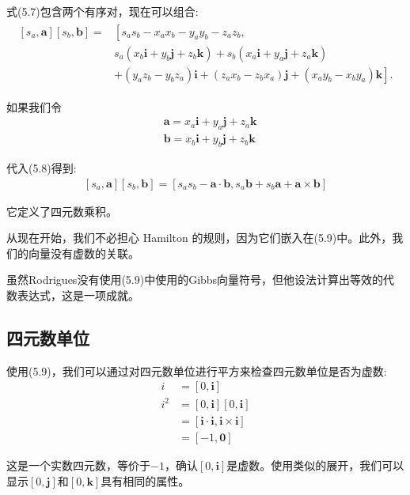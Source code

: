式(5.7)包含两个有序对，现在可以组合:
\begin{align}
    \begin{aligned}
        {\left[s_{a}, \mathbf{a}\right]\left[s_{b}, \mathbf{b}\right]=} & {\left[s_{a} s_{b}-x_{a} x_{b}-y_{a} y_{b}-z_{a} z_{b},\right.} \\
        & s_{a}\left(x_{b} \mathbf{i}+y_{b} \mathbf{j}+z_{b} \mathbf{k}\right)+s_{b}\left(x_{a} \mathbf{i}+y_{a} \mathbf{j}+z_{a} \mathbf{k}\right) \\
        & \left.+\left(y_{a} z_{b}-y_{b} z_{a}\right) \mathbf{i}+\left(z_{a} x_{b}-z_{b} x_{a}\right) \mathbf{j}+\left(x_{a} y_{b}-x_{b} y_{a}\right) \mathbf{k}\right] .
    \end{aligned}
\end{align}

如果我们令
$$
\begin{aligned}
& \mathbf{a}=x_{a} \mathbf{i}+y_{a} \mathbf{j}+z_{a} \mathbf{k} \\
& \mathbf{b}=x_{b} \mathbf{i}+y_{b} \mathbf{j}+z_{b} \mathbf{k}
\end{aligned}
$$

代入(5.8)得到:
\begin{align}
    \left[s_{a}, \mathbf{a}\right]\left[s_{b}, \mathbf{b}\right]=\left[s_{a} s_{b}-\mathbf{a} \cdot \mathbf{b}, s_{a} \mathbf{b}+s_{b} \mathbf{a}+\mathbf{a} \times \mathbf{b}\right]
\end{align}

它定义了四元数乘积。

从现在开始，我们不必担心 Hamilton 的规则，因为它们嵌入在(5.9)中。此外，我们的向量没有虚数的关联。

虽然Rodrigues没有使用(5.9)中使用的Gibbs向量符号，但他设法计算出等效的代数表达式，这是一项成就。

\subsection{四元数单位}
使用(5.9)，我们可以通过对四元数单位进行平方来检查四元数单位是否为虚数:
$$
\begin{aligned}
i & =[0, \mathbf{i}] \\
i^{2} & =[0, \mathbf{i}][0, \mathbf{i}] \\
& =[\mathbf{i} \cdot \mathbf{i}, \mathbf{i} \times \mathbf{i}] \\
& =[-1, \mathbf{0}]
\end{aligned}
$$

这是一个实数四元数，等价于$-1$，确认$[0,\mathbf{i}]$是虚数。使用类似的展开，我们可以显示$[0,\mathbf{j}]$和$[0,\mathbf{k}]$具有相同的属性。

